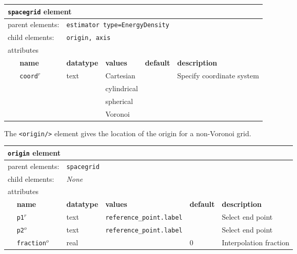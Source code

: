 \FloatBarrier
\begin{table}[h]
\begin{center}
\begin{tabularx}{\textwidth}{l l l l l X }
\hline
\multicolumn{6}{l}{\texttt{spacegrid} element} \\
\hline
\multicolumn{2}{l}{parent elements:} & \multicolumn{4}{l}{\texttt{estimator type=EnergyDensity}}\\
\multicolumn{2}{l}{child  elements:} & \multicolumn{4}{l}{\texttt{origin, axis}}\\
\multicolumn{2}{l}{attributes}  & \multicolumn{4}{l}{}\\
   &   \bfseries name     & \bfseries datatype & \bfseries values & \bfseries default   & \bfseries description \\
   &   \texttt{coord}$^r$ &  text              & Cartesian        &                     & Specify coordinate system \\
   &                      &                    & cylindrical      &                     &                           \\
   &                      &                    & spherical        &                     &                           \\
   &                      &                    & Voronoi          &                     &                           \\
  \hline
\end{tabularx}
\end{center}
\end{table}
\FloatBarrier


The \texttt{<origin/>} element gives the location of the origin for a non-Voronoi grid.\\

\FloatBarrier
\begin{table}[h]
\begin{center}
\begin{tabularx}{\textwidth}{l l l l l X }
\hline
\multicolumn{6}{l}{\texttt{origin} element} \\
\hline
\multicolumn{2}{l}{parent elements:} & \multicolumn{4}{l}{\texttt{spacegrid}}\\
\multicolumn{2}{l}{child  elements:} & \multicolumn{4}{l}{\textit{None}}\\
\multicolumn{2}{l}{attributes}  & \multicolumn{4}{l}{}\\
   &   \bfseries name     & \bfseries datatype & \bfseries values & \bfseries default   & \bfseries description \\
   &   \texttt{p1}$^r$      &  text              & \texttt{reference\_point.label}   &    &  Select end point       \\
   &   \texttt{p2}$^o$      &  text              & \texttt{reference\_point.label}   &    &  Select end point       \\
   &   \texttt{fraction}$^o$&  real              &                  &  0                  &  Interpolation fraction \\
  \hline
\end{tabularx}
\end{center}
\end{table}

